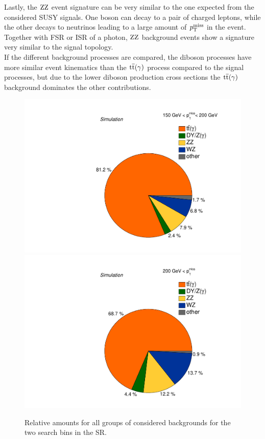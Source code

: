 Lastly, the $\mathrm{Z}\mathrm{Z}$ event signature can be very similar to the one expected from the considered SUSY signals. One boson can decay to a pair of charged leptons, while the other decays to neutrinos leading to a large amount of $p_{\mathrm{T}}^\text{miss}$ in the event. Together with FSR or ISR of a photon, $\mathrm{Z}\mathrm{Z}$ background events show a signature very similar to the signal topology.\\
If the different background processes are compared, the diboson processes have more similar event kinematics than the ${\mathrm{t}\overline{\mathrm{t}}}(\gamma)$ process compared to the signal processes, but due to the lower diboson production cross sections the ${\mathrm{t}\overline{\mathrm{t}}}(\gamma)$ background dominates the other contributions.
\begin{figure}[tbp]
 \centering
 \includegraphics[width=\pairwidth]{figures/figures/pie1}
 \includegraphics[width=\pairwidth]{figures/figures/pie2}
 \caption{Relative amounts for all groups of considered backgrounds for the two search bins in the SR.}
 \label{fig:PieCharts}
\end{figure}
